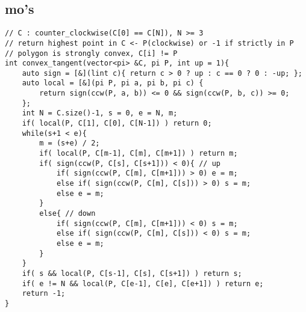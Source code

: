 \documentclass[landscape, 8pt, a4paper, oneside, twocolumn]{extarticle}
\begin{document}
\subsection{mo's}
\begin{verbatim}
// C : counter_clockwise(C[0] == C[N]), N >= 3
// return highest point in C <- P(clockwise) or -1 if strictly in P
// polygon is strongly convex, C[i] != P
int convex_tangent(vector<pi> &C, pi P, int up = 1){
	auto sign = [&](lint c){ return c > 0 ? up : c == 0 ? 0 : -up; };
	auto local = [&](pi P, pi a, pi b, pi c) {
		return sign(ccw(P, a, b)) <= 0 && sign(ccw(P, b, c)) >= 0;
	};
	int N = C.size()-1, s = 0, e = N, m;
	if( local(P, C[1], C[0], C[N-1]) ) return 0;
	while(s+1 < e){
		m = (s+e) / 2;
		if( local(P, C[m-1], C[m], C[m+1]) ) return m;
		if( sign(ccw(P, C[s], C[s+1])) < 0){ // up
			if( sign(ccw(P, C[m], C[m+1])) > 0) e = m;
			else if( sign(ccw(P, C[m], C[s])) > 0) s = m;
			else e = m;
		}
		else{ // down
			if( sign(ccw(P, C[m], C[m+1])) < 0) s = m;
			else if( sign(ccw(P, C[m], C[s])) < 0) s = m;
			else e = m;
		}
	}
	if( s && local(P, C[s-1], C[s], C[s+1]) ) return s;
	if( e != N && local(P, C[e-1], C[e], C[e+1]) ) return e;
	return -1;
}
\end{verbatim}
\end{document}
